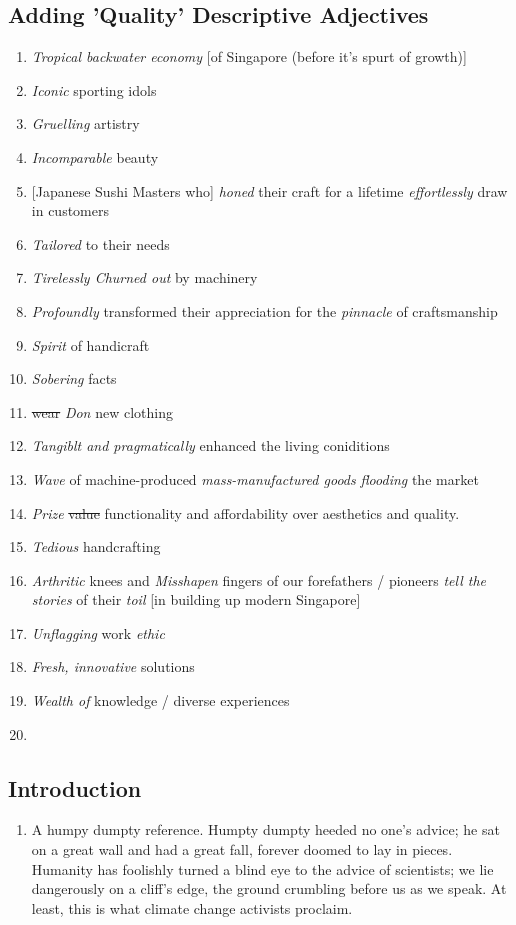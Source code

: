 \documentclass[oneside]{book}
\begin{document}
\subsection{Adding 'Quality' Descriptive Adjectives}
\begin{enumerate}
    \item \emph{Tropical backwater economy} [of Singapore (before it's spurt of growth)]
    \item \emph{Iconic} sporting idols
    \item \emph{Gruelling} artistry
    \item \emph{Incomparable} beauty
    \item \small [Japanese Sushi Masters who] \normalsize \emph{honed} their craft for a lifetime \emph{effortlessly} draw in customers
    \item \emph{Tailored} to their needs
    \item \emph{Tirelessly Churned out} by machinery
    \item \emph{Profoundly} transformed their appreciation for the \emph{pinnacle} of craftsmanship
    \item \emph{Spirit} of handicraft
    \item \emph{Sobering} facts
    \item \st{wear} \emph{Don} new clothing
    \item \emph{Tangiblt and pragmatically} enhanced the living coniditions
    \item \emph{Wave} of machine-produced \emph{mass-manufactured goods} \emph{flooding} the market
    \item \emph{Prize} \st{value} functionality and affordability over aesthetics and quality.
    \item \emph{Tedious} handcrafting
    \item \emph{Arthritic} knees and \emph{Misshapen} fingers of our forefathers / pioneers \emph{tell the stories} of their \emph{toil} [in building up modern Singapore]
    \item \emph{Unflagging} work \emph{ethic}
    \item \emph{Fresh, innovative} solutions
    \item \emph{Wealth of} knowledge / diverse experiences
    \item 
\end{enumerate}
\subsection{Introduction}
\begin{enumerate}
    \item A humpy dumpty reference. Humpty dumpty heeded no one's advice; he sat on a great wall and had a great fall, forever doomed to lay in pieces. Humanity has foolishly turned a blind eye to the advice of scientists; we lie dangerously on a cliff's edge, the ground crumbling before us as we speak. At least, this is what climate change activists proclaim.
\end{enumerate}
\end{document}
